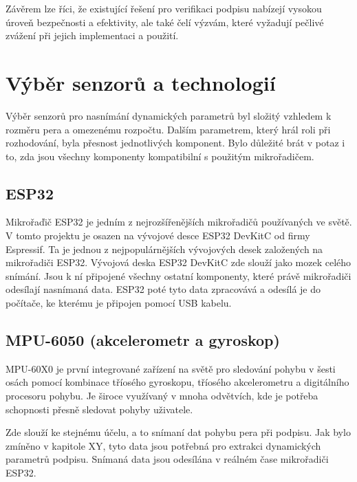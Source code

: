 Závěrem lze říci, že existující řešení pro verifikaci podpisu nabízejí vysokou úroveň bezpečnosti a efektivity, ale také čelí výzvám, které vyžadují pečlivé zvážení při jejich implementaci a použití.%

\section{Výběr senzorů a technologií}
Výběr senzorů pro nasnímání dynamických parametrů byl složitý vzhledem k rozměru pera a omezenému rozpočtu. %
Dalším parametrem, který hrál roli při rozhodování, byla přesnost jednotlivých komponent.                   %
Bylo důležité brát v potaz i to, zda jsou všechny komponenty kompatibilní s použitým mikrořadičem.          %

\subsection*{ESP32}
Mikrořaďič ESP32 je jedním z nejrozšířenějších mikrořadičů používaných ve světě.                            %
V tomto projektu je osazen na vývojové desce ESP32 DevKitC od firmy Espressif.                              %
Ta je jednou z nejpopulárnějších vývojových desek založených na mikrořadiči ESP32.                          %
Vývojová deska ESP32 DevKitC zde slouží jako mozek celého snímání.                                          %
Jsou k ní připojené všechny ostatní komponenty, které právě mikrořadiči odesílají nasnímaná data.           %
ESP32 poté tyto data zpracovává a odesílá je do počítače, ke kterému je připojen  pomocí USB kabelu.        %

\subsection*{MPU-6050 (akcelerometr a gyroskop)}
MPU-60X0 je první integrované zařízení na světě pro sledování pohybu v šesti osách pomocí           %
kombinace tříosého gyroskopu, tříosého akcelerometru a digitálního procesoru pohybu.                %
Je široce využívaný v mnoha odvětvích, kde je potřeba schopnosti přesně sledovat pohyby uživatele.  %

Zde slouží ke stejnému účelu, a to snímaní dat pohybu pera při podpisu.                             %
Jak bylo zmíněno v kapitole XY, tyto data jsou potřebná pro extrakci dynamických parametrů podpisu. %
Snímaná data jsou odesílána v reálném čase mikrořadiči ESP32.                                       %

